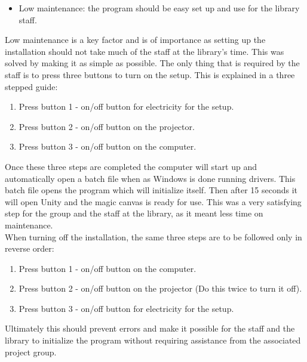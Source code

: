 \begin{itemize}
\item Low maintenance: the program should be easy set up and use for the library staff.
\end{itemize}
Low maintenance is a key factor and is of importance as setting up the installation should not take much of the staff at the library's time. This was solved by making it as simple as possible. The only thing that is required by the staff is to press three buttons to turn on the setup. This is explained in a three stepped guide:
\begin{enumerate}
\item Press button 1 - on/off button for electricity for the setup.
\item Press button 2 - on/off button on the projector.
\item Press button 3 - on/off button on the computer.
\end{enumerate}
Once these three steps are completed the computer will start up and automatically open a batch file when as Windows is done running drivers. This batch file opens the program which will initialize itself. Then after 15 seconds it will open Unity and the magic canvas is ready for use. This was a very satisfying step for the group and the staff at the library, as it meant less time on maintenance.\\
When turning off the installation, the same three steps are to be followed only in reverse order:
\begin{enumerate}
\item Press button 1 - on/off button on the computer.
\item Press button 2 - on/off button on the projector (Do this twice to turn it off).
\item Press button 3 - on/off button for electricity for the setup.
\end{enumerate}
Ultimately this should prevent errors and make it possible for the staff and the library to initialize the program without requiring assistance from the associated project group.


